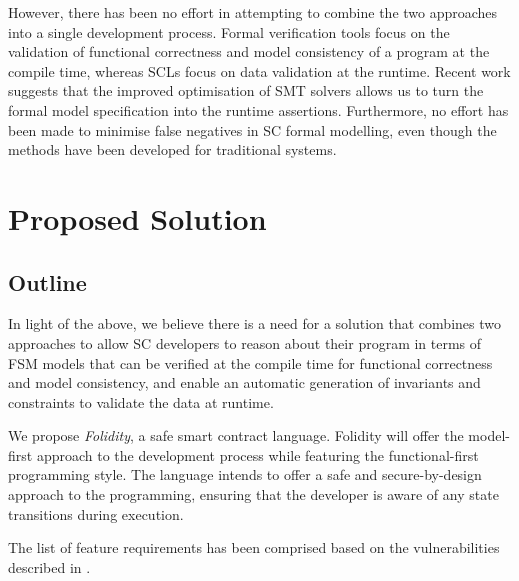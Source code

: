 \documentclass[oneside]{ecsproject}     %
\begin{document}
However, there has been no effort in attempting to combine the two approaches into a single development process. Formal verification tools
focus on the validation of functional correctness and model consistency of a program at the compile time, whereas SCLs focus on data validation 
at the runtime. Recent work suggests that the improved optimisation of SMT solvers allows us to turn the formal model specification into 
the runtime assertions\cite{runtime_assert}. Furthermore, no effort has been made to minimise false negatives in SC formal modelling, 
even though the methods have been developed for traditional systems\cite{event_b}.


\chapter{Proposed Solution} \label{Chapter:Solution}

\section{Outline}

In light of the above, we believe there is a need for a solution that combines two approaches to allow SC developers to reason
about their program in terms of FSM models that can be verified at the compile time for functional correctness and model consistency,
and enable an automatic generation of invariants and constraints to validate the data at runtime.

We propose \textit{Folidity}, a safe smart contract language. Folidity will offer the model-first approach to the development process
while featuring the functional-first programming style. The language intends to offer a safe and secure-by-design approach to the programming, 
ensuring that the developer is aware of any state transitions during execution.

The list of feature requirements has been comprised based on the vulnerabilities described in .
\end{document}
